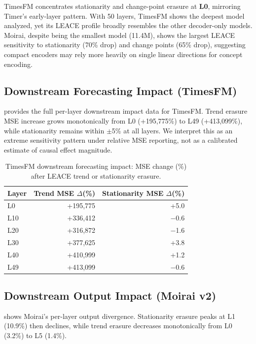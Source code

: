 \documentclass{article}
\begin{document}
TimesFM concentrates stationarity and change-point erasure at \textbf{L0}, mirroring Timer's early-layer pattern. With 50 layers, TimesFM shows the deepest model analyzed, yet its LEACE profile broadly resembles the other decoder-only models. Moirai, despite being the smallest model (11.4M), shows the largest LEACE sensitivity to stationarity (70\% drop) and change points (65\% drop), suggesting compact encoders may rely more heavily on single linear directions for concept encoding.

\subsection{Downstream Forecasting Impact (TimesFM)}

 provides the full per-layer downstream impact data for TimesFM. Trend erasure MSE increase grows monotonically from L0 (+195,775\%) to L49 (+413,099\%), while stationarity remains within $\pm$5\% at all layers. We interpret this as an extreme sensitivity pattern under relative MSE reporting, not as a calibrated estimate of causal effect magnitude.

\begin{table}[tbp]
\caption{TimesFM downstream forecasting impact: MSE change (\%) after LEACE trend or
stationarity erasure.}
\label{tab:timesfm_downstream}
\centering
\begin{tabular}{lrr}
\toprule
Layer & Trend MSE $\Delta$(\%) & Stationarity MSE $\Delta$(\%) \\
\midrule
L0 & +195,775 & +5.0 \\
L10 & +336,412 & $-$0.6 \\
L20 & +316,872 & $-$1.6 \\
L30 & +377,625 & +3.8 \\
L40 & +410,999 & +1.2 \\
L49 & +413,099 & $-$0.6 \\
\bottomrule
\end{tabular}
\end{table}

\subsection{Downstream Output Impact (Moirai v2)}

 shows Moirai's per-layer output divergence. Stationarity erasure peaks at L1 (10.9\%) then declines, while trend erasure decreases monotonically from L0 (3.2\%) to L5 (1.4\%).
\end{document}
